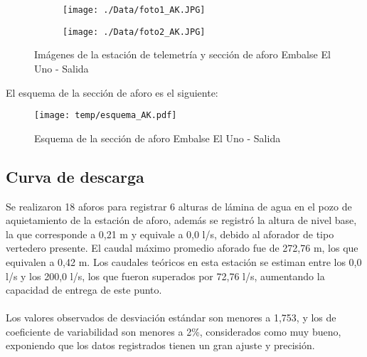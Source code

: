 \documentclass[]{article}
\begin{document}
\begin{figure}[H]
  \centering
\begin{subfigure}{.49\textwidth}
  \texttt{[image: ./Data/foto1\_AK.JPG]}
\end{subfigure}
\hfill
\begin{subfigure}{.49\textwidth}
  \texttt{[image: ./Data/foto2\_AK.JPG]}
\end{subfigure}
\caption{Imágenes de la estación de telemetría y sección de aforo Embalse El Uno - Salida}
\label{fig:fotos_11}
\end{figure}

El esquema de la sección de aforo es el siguiente:

\begin{figure}[H]
  \centering
  \texttt{[image: temp/esquema\_AK.pdf]}
\caption{Esquema de la sección de aforo Embalse El Uno - Salida}
\label{fig:Esquema_AK}
\end{figure}

\subsection{Curva de descarga}\label{curva-de-descarga-10}

Se realizaron 18 aforos para registrar 6 alturas de lámina de agua en el pozo de aquietamiento de la estación de aforo, además se registró la altura de nivel base, la que corresponde a 0,21 m y equivale a 0,0 l/s, debido al aforador de tipo vertedero presente. El caudal máximo promedio aforado fue de 272,76 m, los que equivalen a 0,42 m. Los caudales teóricos en esta estación se estiman entre los 0,0 l/s y los 200,0 l/s, los que fueron superados por 72,76 l/s, aumentando la capacidad de entrega de este punto.\\
\\
Los valores observados de desviación estándar son menores a 1,753, y los de coeficiente de variabilidad son menores a 2\%, considerados como muy bueno, exponiendo que los datos registrados tienen un gran ajuste y precisión.
\end{document}
